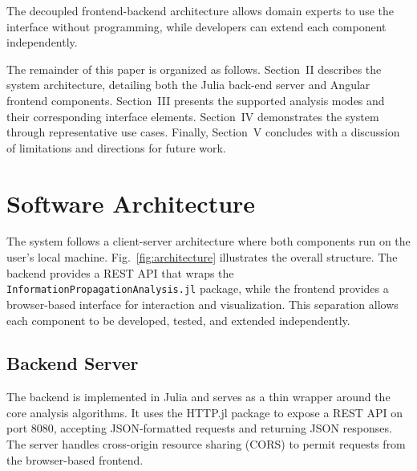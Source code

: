 \documentclass[conference]{IEEEtran}
\begin{document}
The decoupled frontend-backend architecture allows domain experts to use the interface without programming, while developers can extend each component independently.

The remainder of this paper is organized as follows. Section~II describes the system architecture, detailing both the Julia back-end server and Angular frontend components. Section~III presents the supported analysis modes and their corresponding interface elements. Section~IV demonstrates the system through representative use cases. Finally, Section~V concludes with a discussion of limitations and directions for future work.

\section{Software Architecture}

The system follows a client-server architecture where both components run on the user's local machine. Fig.~\ref{fig:architecture} illustrates the overall structure. The backend provides a REST API that wraps the \texttt{InformationPropagationAnalysis.jl} package, while the frontend provides a browser-based interface for interaction and visualization. This separation allows each component to be developed, tested, and extended independently.


\subsection{Backend Server}

The backend is implemented in Julia and serves as a thin wrapper around the core analysis algorithms. It uses the HTTP.jl package to expose a REST API on port 8080, accepting JSON-formatted requests and returning JSON responses. The server handles cross-origin resource sharing (CORS) to permit requests from the browser-based frontend.
\end{document}
